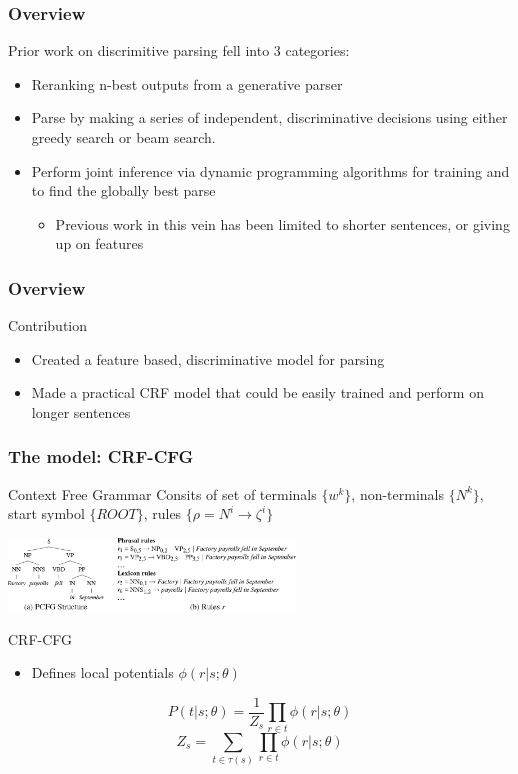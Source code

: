 \documentclass{beamer}
\begin{document}
\begin{frame}
  \frametitle{Overview}

  Prior work on discrimitive parsing fell into 3 categories:
  \begin{itemize}
    \item Reranking n-best outputs from a generative parser
    \item Parse by making a series of independent, discriminative decisions using either greedy
          search or beam search.
    \item Perform joint inference via dynamic programming algorithms for training and to
          find the globally best parse
    \begin{itemize}
      \item Previous work in this vein has been limited to shorter sentences, or giving up
            on features
    \end{itemize}
  \end{itemize}

\end{frame}

\begin{frame}
  \frametitle{Overview}

  \begin{block}{Contribution}
    \begin{itemize}
      \item Created a feature based, discriminative model for parsing
      \item Made a practical CRF model that could be easily trained and perform on longer sentences
    \end{itemize}
  \end{block}

\end{frame}

\begin{frame}
  \frametitle{The model: CRF-CFG}

  \begin{block}{Context Free Grammar}
    Consits of set of terminals $\{w^k\}$, non-terminals $\{N^k\}$, start symbol $\{ROOT\}$,
    rules $\{\rho = N^i \rightarrow \zeta^i\}$
    
  \end{block}

  \vspace{.25in}
  \includegraphics[width=3in]{crfcfg.png}

  \begin{block}{CRF-CFG}
    \begin{itemize}
      \item Defines local potentials $\phi(r | s; \theta)$
    \end{itemize}
    $$P(t | s ; \theta) = \dfrac{1}{Z_s} \prod_{r \in t} \phi(r | s; \theta)$$
    $$Z_s = \sum_{t \in \tau(s)} \prod_{r \in t} \phi(r | s; \theta)$$
  \end{block}


\end{frame}
\end{document}
